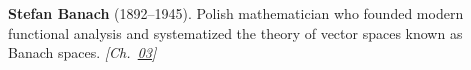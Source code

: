 \textbf{Stefan Banach} (1892–1945). Polish mathematician who founded modern functional analysis and systematized the theory of vector spaces known as Banach spaces. \emph{[Ch.~\hyperref[ch:banach]{03}]}

